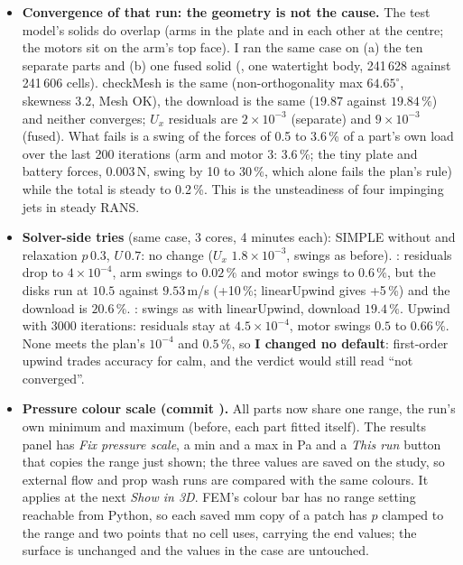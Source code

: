 \begin{itemize}[nosep]
        $0.124$\,N, $3.3\,\%$), each arm $0.076$\,N, $2.0\,\%$ (before $2.0\,\%$), plate and battery $0.1\,\%$. The hub is smaller than
        the 28\,mm motor, so most of the pressure under the disk still reaches the motor; the saving is 12\,\% of the motor load.
  \item \textbf{Convergence of that run: the geometry is not the cause.} The test model's solids do overlap (arms in the
        plate and in each other at the centre; the motors sit on the arm's top face). I ran the same case on (a) the ten separate
        parts and (b) one fused solid (, one watertight body, 241\,628 against 241\,606 cells). checkMesh is
        the same (non-orthogonality max $64.65^\circ$, skewness $3.2$, Mesh OK), the download is the same ($19.87$ against
        $19.84\,\%$) and neither converges; $U_x$ residuals are $2\times10^{-3}$ (separate) and $9\times10^{-3}$ (fused).
        What fails is a swing of the forces of 0.5 to 3.6\,\% of a part's own load over the last 200 iterations (arm and motor 3:
        3.6\,\%; the tiny plate and battery forces, $0.003$\,N, swing by 10 to 30\,\%, which alone fails the plan's rule) while
        the total is steady to 0.2\,\%. This is the unsteadiness of four impinging jets in steady RANS.
  \item \textbf{Solver-side tries} (same case, 3 cores, 4 minutes each): SIMPLE without  and relaxation
        $p\,0.3$, $U\,0.7$: no change ($U_x$ $1.8\times10^{-3}$, swings as before).  : residuals drop to
        $4\times10^{-4}$, arm swings to $0.02\,\%$ and motor swings to $0.6\,\%$, but the disks run at $10.5$ against $9.53$\,m/s
        (+10\,\%; linearUpwind gives +5\,\%) and the download is $20.6\,\%$. : swings as with
        linearUpwind, download $19.4\,\%$. Upwind with 3000 iterations: residuals stay at $4.5\times10^{-4}$, motor swings $0.5$ to
        $0.66\,\%$. None meets the plan's $10^{-4}$ and $0.5\,\%$, so \textbf{I changed no default}: first-order upwind
        trades accuracy for calm, and the verdict would still read ``not converged''.
  \item \textbf{Pressure colour scale (commit ).} All parts now share one range, the run's own
        minimum and maximum (before, each part fitted itself). The results panel has \emph{Fix pressure scale}, a min and a max in
        Pa and a \emph{This run} button that copies the range just shown; the three values are saved on the study, so
        external flow and prop wash runs are compared with the same colours. It applies at the next \emph{Show in 3D}. FEM's colour
        bar has no range setting reachable from Python, so each saved mm copy of a patch has $p$ clamped to the range and two
        points that no cell uses, carrying the end values; the surface is unchanged and the values in the case are untouched.
\end{itemize}

